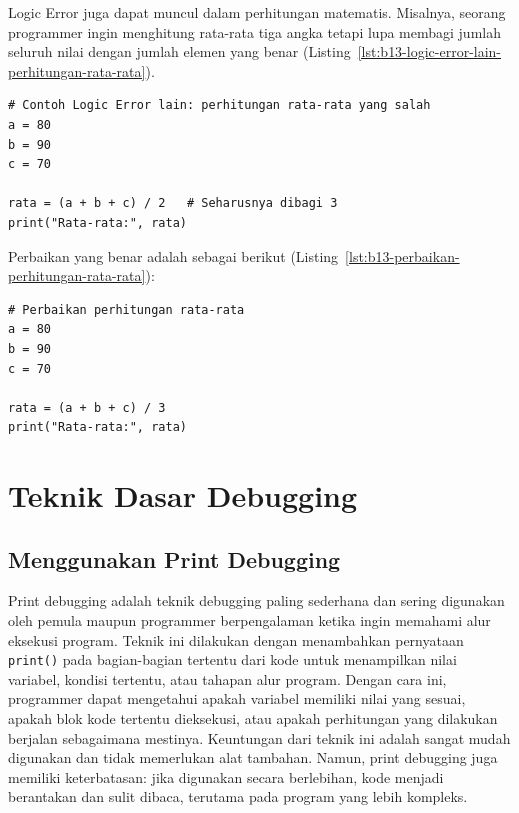 Logic Error juga dapat muncul dalam perhitungan matematis. Misalnya, seorang programmer ingin menghitung rata-rata tiga angka tetapi lupa membagi jumlah seluruh nilai dengan jumlah elemen yang benar (Listing~\ref{lst:b13-logic-error-lain-perhitungan-rata-rata}).

\begin{lstlisting}[style=PythonStyle, caption={Contoh Logic Error lain: perhitungan rata-rata yang salah}, label={lst:b13-logic-error-lain-perhitungan-rata-rata}]
# Contoh Logic Error lain: perhitungan rata-rata yang salah
a = 80
b = 90
c = 70

rata = (a + b + c) / 2   # Seharusnya dibagi 3
print("Rata-rata:", rata)
\end{lstlisting}

Perbaikan yang benar adalah sebagai berikut (Listing~\ref{lst:b13-perbaikan-perhitungan-rata-rata}):

\begin{lstlisting}[style=PythonStyle, caption={Perbaikan perhitungan rata-rata}, label={lst:b13-perbaikan-perhitungan-rata-rata}]
# Perbaikan perhitungan rata-rata
a = 80
b = 90
c = 70

rata = (a + b + c) / 3
print("Rata-rata:", rata)
\end{lstlisting}


\section{Teknik Dasar Debugging}

\subsection{Menggunakan Print Debugging}

Print debugging adalah teknik debugging paling sederhana dan sering digunakan oleh pemula maupun programmer berpengalaman ketika ingin memahami alur eksekusi program. Teknik ini dilakukan dengan menambahkan pernyataan \texttt{print()} pada bagian-bagian tertentu dari kode untuk menampilkan nilai variabel, kondisi tertentu, atau tahapan alur program. Dengan cara ini, programmer dapat mengetahui apakah variabel memiliki nilai yang sesuai, apakah blok kode tertentu dieksekusi, atau apakah perhitungan yang dilakukan berjalan sebagaimana mestinya. Keuntungan dari teknik ini adalah sangat mudah digunakan dan tidak memerlukan alat tambahan. Namun, print debugging juga memiliki keterbatasan: jika digunakan secara berlebihan, kode menjadi berantakan dan sulit dibaca, terutama pada program yang lebih kompleks.

